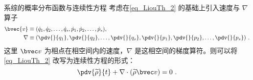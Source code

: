 \begin{corollary}{系综的概率分布函数与连续性方程}
考虑在\autoref{eq_LiouTh_2} 的基础上引入速度与 $\nabla$ 算子
\begin{equation}
\begin{aligned}
\bvec{v} &\equiv (\dot q_1, \dot q_2, \dots, \dot q_s, \dot p_1, \dot p_2, \dots, \dot p_s), \\
\nabla &\equiv (\pdv{}{q_1}, \pdv{}{q_2}, \dots, \pdv{}{q_s}, \pdv{}{p_1}, \pdv{}{p_2}, \dots, \pdv{}{p_s}) ~.
\end{aligned}
\end{equation}
这里 $\bvec v$ 为相点在相空间内的速度，$\nabla$ 是这相空间的梯度算符。则可以将\autoref{eq_LiouTh_2} 改写为连续性方程的形式：
\begin{equation}
\pdv{\widetilde \rho}{t} + \nabla \cdot \left(  \widetilde \rho \bvec v\right) = 0 ~.
\end{equation}
\end{corollary}
